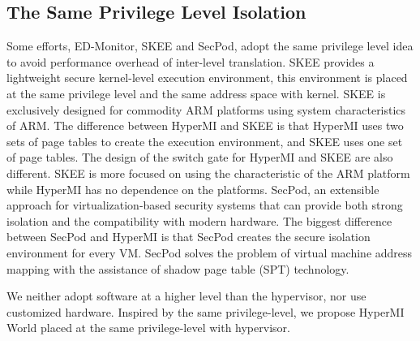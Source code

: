\documentclass[conference]{IEEEtran}
\begin{document}
\subsection{The Same Privilege Level Isolation}
Some efforts, ED-Monitor\cite{Deng2017Dancing}, SKEE\cite{Azab2016SKEE} and SecPod\cite{Wang2015SecPod}, adopt the same privilege level idea to avoid performance overhead of inter-level translation.
 SKEE provides a lightweight secure kernel-level execution environment, this environment is placed at the same privilege level and the same address space with kernel. SKEE is exclusively designed for commodity ARM platforms using system characteristics of ARM. The difference between HyperMI and SKEE is that HyperMI uses two sets of page tables to create the execution environment, and SKEE uses one set of page tables. The design of the switch gate for HyperMI and SKEE are also different. SKEE is more focused on using the characteristic of the ARM platform while HyperMI has no dependence on the platforms.
SecPod, an extensible approach for virtualization-based security systems that can provide both strong isolation and the compatibility with modern hardware. The biggest difference between SecPod and HyperMI is that SecPod creates the secure isolation environment for every VM. SecPod solves the problem of virtual machine address mapping with the assistance of shadow page table (SPT) technology.

We neither adopt software at a higher level than the hypervisor, nor use customized hardware. Inspired by the same privilege-level, we propose HyperMI World placed at the same privilege-level with hypervisor.
\end{document}
